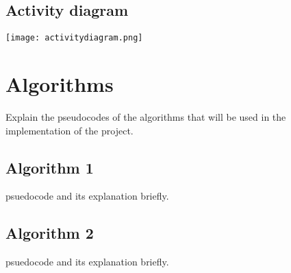 \documentclass{scrreprt}
\begin{document}
\section{Activity diagram}
\begin{center}
    \texttt{[image: activitydiagram.png]}
\end{center}

\chapter{Algorithms}
Explain the pseudocodes of the algorithms that will be used in the implementation of the project.
\section{Algorithm 1}
psuedocode and its explanation briefly.
\section{Algorithm 2}
psuedocode and its explanation briefly.
\begin{thebibliography}{999}

\bibitem{} 
\bibitem{}

\bibitem{} 

\bibitem{} 

\bibitem{} 

\bibitem{} 



\end{thebibliography}
\end{document}

